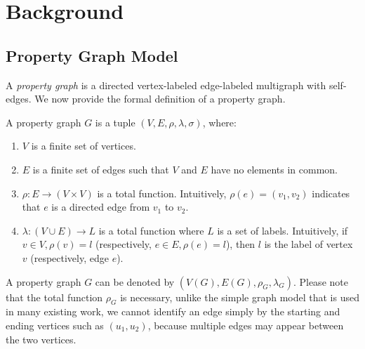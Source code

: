 \section{Background}\label{sec:background}
\subsection{Property Graph Model}
A \emph{property graph} is a directed vertex-labeled edge-labeled multigraph with self-edges.
We now provide the formal definition of a property graph.
\begin{definition}
  A property graph $G$ is a tuple $(V, E, \rho, \lambda, \sigma)$, where:
  \begin{enumerate}[noitemsep,label={(\arabic*)}]
  \item $V$ is a finite set of vertices.
  \item $E$ is a finite set of edges such that $V$ and $E$ have no elements in common.
  \item $\rho: E \rightarrow (V \times V)$ is a total function.
    Intuitively, $\rho(e) = (v_1, v_2)$ indicates that $e$ is a directed edge from $v_1$ to $v_2$.
  \item $\lambda :(V \cup E) \rightarrow L$ is a total function where $L$ is a set of labels.
    Intuitively, if $v \in V, \rho(v) = l$ (respectively, $e \in E, \rho(e) = l$),
    then $l$ is the label of vertex $v$ (respectively, edge $e$).
  \end{enumerate}
\end{definition}
A property graph $G$ can be denoted by $(V(G), E(G), \rho_G, \lambda_G)$.
Please note that the total function $\rho_G$ is necessary, unlike the simple graph model that is used in many existing work,
we cannot identify an edge simply by the starting and ending vertices such as $(u_1, u_2)$,
because multiple edges may appear between the two vertices.
